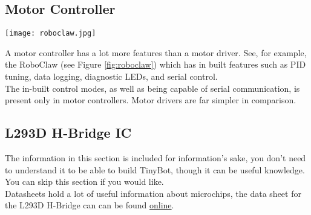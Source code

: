 \documentclass[../TinyBot.tex]{subfiles}
\begin{document}
\subsection{Motor Controller}

\begin{minipage}{0.3\textwidth}\vspace{0pt}
    \centering
    \texttt{[image: roboclaw.jpg]}
    \label{fig:roboclaw}
\end{minipage}

\begin{minipage}{0.7\textwidth}\vspace{0pt}
    A motor controller has a lot more features than a motor driver. See, for example, the RoboClaw
    (see Figure \ref{fig:roboclaw}) which has in built features such as PID tuning, data logging,
    diagnostic LEDs, and serial control. \\
    
    The in-built control modes, as well as being capable of serial communication, is present only
    in motor controllers. Motor drivers are far simpler in comparison. \\
\end{minipage}

\pagebreak
\subsection{L293D H-Bridge IC}

The information in this section is included for information's sake, you don't need to
understand it to be able to build TinyBot, though it can be useful knowledge.
You can skip this section if you would like. \\

Datasheets hold a lot of useful information about microchips, the data sheet for the L293D
H-Bridge can can be found \href{https://www.altronics.com.au/p/z2900-l293d-motor-drive-ic/}{online}.




        
\end{document}
